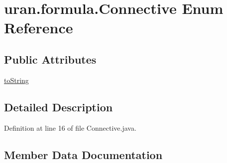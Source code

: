 \hypertarget{enumuran_1_1formula_1_1_connective}{}\section{uran.\+formula.\+Connective Enum Reference}
\label{enumuran_1_1formula_1_1_connective}
\subsection*{Public Attributes}
\begin{DoxyCompactItemize}
\item 
\hyperlink{enumuran_1_1formula_1_1_connective_a90aafb9dc47b7700e3717c06f4c568c2}{to\+String}
\end{DoxyCompactItemize}


\subsection{Detailed Description}


Definition at line 16 of file Connective.\+java.



\subsection{Member Data Documentation}
\hypertarget{enumuran_1_1formula_1_1_connective_a90aafb9dc47b7700e3717c06f4c568c2}{}
